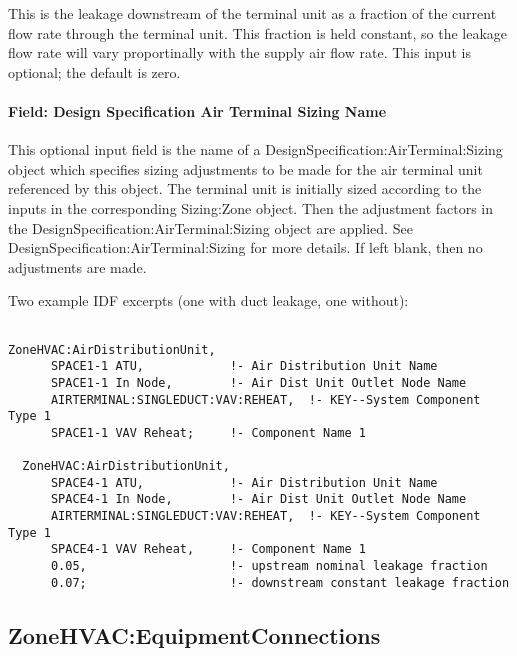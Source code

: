 This is the leakage downstream of the terminal unit as a fraction of the current flow rate through the terminal unit. This fraction is held constant, so the leakage flow rate will vary proportinally with the supply air flow rate. This input is optional; the default is zero.

\paragraph{Field: Design Specification Air Terminal Sizing Name}\label{design-specification-air-terminal-sizing-name2}

This optional input field is the name of a DesignSpecification:AirTerminal:Sizing object which specifies sizing adjustments to be made for the air terminal unit referenced by this object. The terminal unit is initially sized according to the inputs in the corresponding Sizing:Zone object. Then the adjustment factors in the DesignSpecification:AirTerminal:Sizing object are applied. See DesignSpecification:AirTerminal:Sizing for more details. If left blank, then no adjustments are made.

Two example IDF excerpts (one with duct leakage, one without):

\begin{lstlisting}

ZoneHVAC:AirDistributionUnit,
      SPACE1-1 ATU,            !- Air Distribution Unit Name
      SPACE1-1 In Node,        !- Air Dist Unit Outlet Node Name
      AIRTERMINAL:SINGLEDUCT:VAV:REHEAT,  !- KEY--System Component Type 1
      SPACE1-1 VAV Reheat;     !- Component Name 1

  ZoneHVAC:AirDistributionUnit,
      SPACE4-1 ATU,            !- Air Distribution Unit Name
      SPACE4-1 In Node,        !- Air Dist Unit Outlet Node Name
      AIRTERMINAL:SINGLEDUCT:VAV:REHEAT,  !- KEY--System Component Type 1
      SPACE4-1 VAV Reheat,     !- Component Name 1
      0.05,                    !- upstream nominal leakage fraction
      0.07;                    !- downstream constant leakage fraction
\end{lstlisting}

\subsection{ZoneHVAC:EquipmentConnections}\label{zonehvacequipmentconnections}

